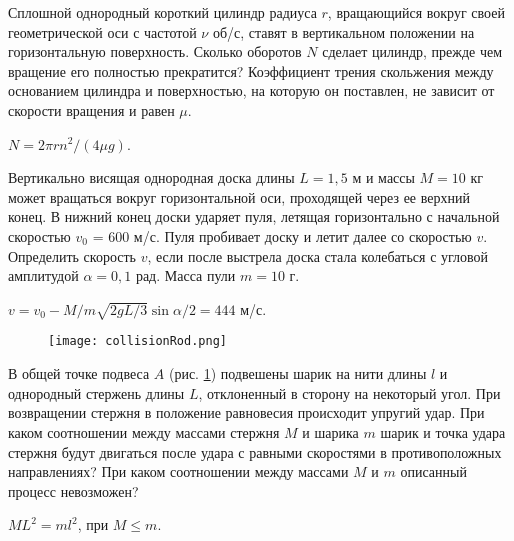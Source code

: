 \begin{ex} %
Сплошной однородный короткий цилиндр радиуса $r$, вращающийся вокруг своей геометрической оси с частотой $\nu$ об/с, ставят в вертикальном положении на горизонтальную поверхность. Сколько оборотов $N$ сделает цилиндр, прежде чем вращение его полностью прекратится? Коэффициент трения скольжения между основанием цилиндра и поверхностью, на которую он поставлен, не зависит от скорости вращения и равен $\mu$.
\begin{ans}
$N = 2\pi r n^2/(4 \mu g)$.
\end{ans}
\end{ex}	

\begin{ex} %
Вертикально висящая однородная доска длины $L = 1,5$ м и массы $M = 10$ кг может вращаться вокруг горизонтальной оси, проходящей через ее верхний конец. В нижний конец доски ударяет пуля, летящая горизонтально с начальной скоростью $v_0$ = 600 м/с. Пуля пробивает доску и летит далее со скоростью $v$. Определить скорость $v$, если после выстрела доска стала колебаться с угловой амплитудой $\alpha  = 0,1$ рад. Масса пули $m = 10$ г.
\begin{ans}
$v = v_0 -M/m \sqrt{2gL/3} \sin \alpha /2 = 444$ м/с.
\end{ans}
\end{ex}	

\begin{figure}[h]
\centering
\texttt{[image: collisionRod.png]}
\caption{}
\label{collisionRod}
\end{figure}

\begin{ex} %
В общей точке подвеса $A$ (рис. \ref{collisionRod}) подвешены шарик на нити длины $l$ и однородный стержень длины $L$, отклоненный в сторону на некоторый угол. При возвращении стержня в положение равновесия происходит упругий удар. При каком соотношении между массами стержня $M$ и шарика $m$ шарик и точка удара стержня будут двигаться после удара с равными скоростями
в противоположных направлениях? При каком соотношении между
массами $M$ и $m$ описанный процесс невозможен?
\begin{ans}
$ML^2 = ml^2$, при $M \leq m$.
\end{ans}
\end{ex}	

